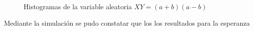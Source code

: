 \documentclass{article}
\begin{document}
\begin{figure}[H]
\centering
{}
\label{fig:a}
\centering
{}
\label{fig:s}
\centering
\caption{Histogramas de la variable aleatoria $XY = (a+b)(a-b)$ }
\label{fig:2} 
\end{figure}

Mediante la simulación se pudo constatar que los los resultados para la esperanza 
\end{document}

